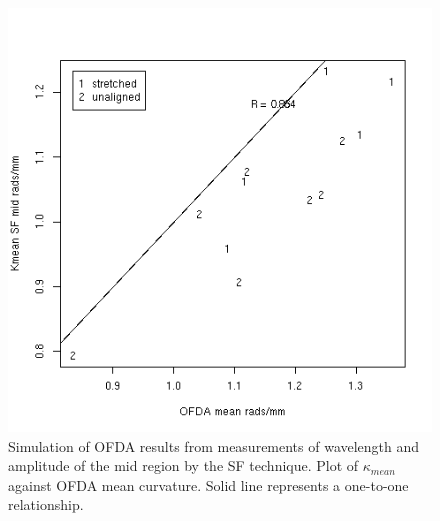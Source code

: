 %

\begin{figure}[!h]
  \centering
  \includegraphics[width=1.0\textwidth]{figofdasimsfmidmean.png}
  \caption{Simulation of OFDA results from measurements of wavelength and amplitude of the mid region by the SF technique. Plot of $\kappa_{mean}$ against OFDA mean curvature. Solid line represents a one-to-one relationship.}
\label{fig:ofdasimsfmidmean}
\end{figure}

%

